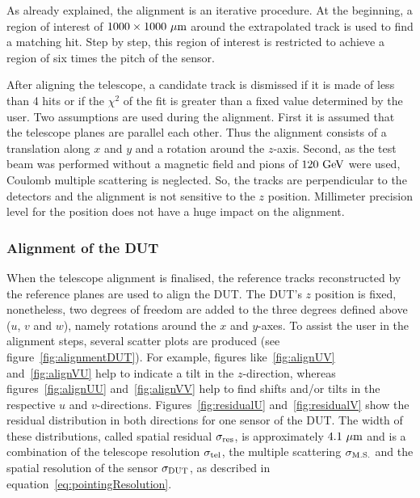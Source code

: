       As already explained, the alignment is an iterative procedure.
      At the beginning, a region of interest of $1000 \times 1000~\rm{\mu m}$ around the extrapolated track is used to find a matching hit.
      Step by step, this region of interest is restricted to achieve a region of six times the pitch of the sensor.
      
      After aligning the telescope, a candidate track is dismissed if it is made of less than 4 hits or if the $\chi^2$ of the fit is greater than a fixed value determined by the user. 
      Two assumptions are used during the alignment.
      First it is assumed that the telescope planes are parallel each other.
      Thus the alignment consists of a translation along $x$ and $y$ and a rotation around the $z$-axis.
      Second, as the test beam was performed without a magnetic field and pions of $120~\rm{GeV}$ were used, Coulomb multiple scattering is neglected.
      So, the tracks are perpendicular to the detectors and the alignment is not sensitive to the $z$ position.
      Millimeter precision level for the position does not have a huge impact on the alignment.

      \subsubsection{Alignment of the DUT}

      When the telescope alignment is finalised, the reference tracks reconstructed by the reference planes are used to align the \gls{DUT}.
      The \gls{DUT}'s $z$ position is fixed, nonetheless, two degrees of freedom are added to the three degrees defined above ($u$, $v$ and $w$), namely rotations around the $x$ and $y$-axes.
      To assist the user in the alignment steps, several scatter plots are produced (see figure~\ref{fig:alignmentDUT}).
      For example, figures like~\ref{fig:alignUV} and~\ref{fig:alignVU} help to indicate a tilt in the $z$-direction, whereas figures~\ref{fig:alignUU} and~\ref{fig:alignVV} help to find shifts and/or tilts in the respective $u$ and $v$-directions.
      Figures~\ref{fig:residualU} and~\ref{fig:residualV} show the residual distribution in both directions for one sensor of the \gls{DUT}.
      The width of these distributions, called spatial residual $\sigma_{\rm{res}}$, is approximately $4.1~\rm{\mu m}$ and is a combination of the telescope resolution $\sigma_{\rm{tel}}$, the multiple scattering $\sigma_{\rm{M.S.}}$ and the spatial resolution of the sensor $\sigma_{\rm{DUT}}$, as described in equation~\ref{eq:pointingResolution}.
      

